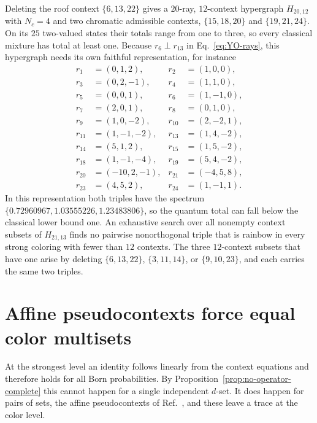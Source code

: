 \documentclass[aps,pra,reprint,superscriptaddress,longbibliography,nofootinbib,floatfix,10pt]{revtex4-2}
\theoremstyle{definition}\newtheorem{definition}[theorem]{Definition}
\theoremstyle{remark}\newtheorem{remark}[theorem]{Remark}
\begin{document}
Deleting the roof context $\{6,13,22\}$ gives a $20$-ray, $12$-context hypergraph $H_{20,12}$ with $N_c=4$ and two chromatic admissible contexts, $\{15,18,20\}$ and $\{19,21,24\}$. On its $25$ two-valued states their totals range from one to three, so every classical mixture has total at least one. Because $r_6\perp r_{13}$ in Eq.~\eqref{eq:YO-rays}, this hypergraph needs its own faithful representation, for instance
\begin{equation}\label{eq:H20-rays}
\begin{aligned}
r_1&=(0,1,2),&r_2&=(1,0,0),\\
r_3&=(0,2,-1),&r_4&=(1,1,0),\\
r_5&=(0,0,1),&r_6&=(1,-1,0),\\
r_7&=(2,0,1),&r_8&=(0,1,0),\\
r_9&=(1,0,-2),&r_{10}&=(2,-2,1),\\
r_{11}&=(1,-1,-2),&r_{13}&=(1,4,-2),\\
r_{14}&=(5,1,2),&r_{15}&=(1,5,-2),\\
r_{18}&=(1,-1,-4),&r_{19}&=(5,4,-2),\\
r_{20}&=(-10,2,-1),&r_{21}&=(-4,5,8),\\
r_{23}&=(4,5,2),&r_{24}&=(1,-1,1).
\end{aligned}
\end{equation}
In this representation both triples have the spectrum $\{0.72960967,1.03555226,1.23483806\}$, so the quantum total can fall below the classical lower bound one. An exhaustive search over all nonempty context subsets of $H_{21,13}$ finds no pairwise nonorthogonal triple that is rainbow in every strong coloring with fewer than $12$ contexts. The three $12$-context subsets that have one arise by deleting $\{6,13,22\}$, $\{3,11,14\}$, or $\{9,10,23\}$, and each carries the same two triples.

\section{Affine pseudocontexts force equal color multisets}\label{sec:paired-affine}
At the strongest level an identity follows linearly from the context equations and therefore holds for all Born probabilities. By Proposition~\ref{prop:no-operator-complete} this cannot happen for a single independent $d$-set. It does happen for pairs of sets, the affine pseudocontexts of Ref.~\cite{2026-Navara-Svozil-pseudocontexts}, and these leave a trace at the color level.
\end{document}
